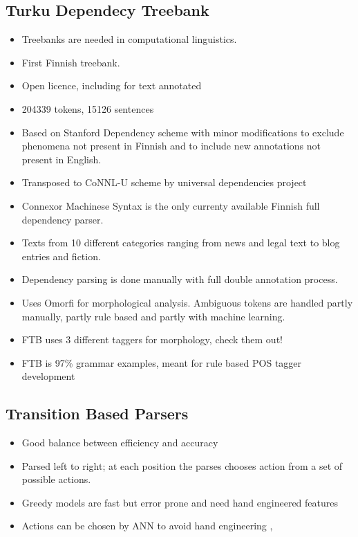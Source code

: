 \documentclass[12pt,a4paper,english
]{tutthesis}
\begin{document}
\subsection{Turku Dependecy Treebank}
\begin{itemize}
\item Treebanks are needed in computational linguistics.
\item First Finnish treebank.
\item Open licence, including for text annotated
\item 204339 tokens, 15126 sentences
\item Based on Stanford Dependency scheme with minor modifications to exclude phenomena not present in Finnish and to include new annotations not present in English.
\item Transposed to CoNNL-U scheme by universal dependencies project
\item Connexor Machinese Syntax is the only currenty available Finnish full dependency parser.
\item Texts from 10 different categories ranging from news and legal text to blog entries and fiction.
\item Dependency parsing is done manually with full double annotation process.
\item Uses Omorfi for morphological analysis. Ambiguous tokens are handled partly manually, partly rule based and partly with machine learning.
\item FTB uses 3 different taggers for morphology, check them out!
\item FTB is 97\% grammar examples, meant for rule based POS tagger development
\end{itemize}

\subsection{Transition Based Parsers}
\begin{itemize}
\item Good balance between efficiency and accuracy \cite{Weiss2015}
\item Parsed left to right; at each position the parses chooses action from a set of possible actions.
\item Greedy models are fast but error prone and need hand engineered features \cite{Weiss2015}
\item Actions can be chosen by ANN to avoid hand engineering \cite{Chen2014}, \cite{Weiss2015}
\end{itemize}
\end{document}
